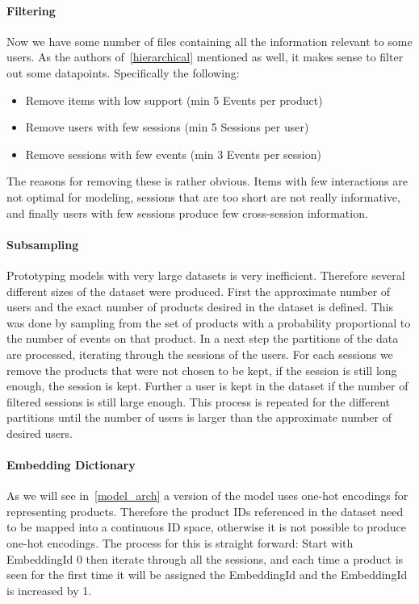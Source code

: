 \paragraph{Filtering}
Now we have some number of files containing all the information relevant to some users.
As the authors of~\ref{hierarchical} mentioned as well, it makes sense to filter out some datapoints.
Specifically the following:
\begin{itemize}
    \item Remove items with low support (min 5 Events per product)
    \item Remove users with few sessions (min 5 Sessions per user)
    \item Remove sessions with few events (min 3 Events per session)
\end{itemize}
The reasons for removing these is rather obvious.
Items with few interactions are not optimal for modeling, sessions that are too short are not really informative, and finally users with few sessions produce few cross-session information.

\paragraph{Subsampling}
Prototyping models with very large datasets is very inefficient.
Therefore several different sizes of the dataset were produced.
First the approximate number of users and the exact number of products desired in the dataset is defined.
This was done by sampling from the set of products with a probability proportional to the number of events on that product.
In a next step the partitions of the data are processed, iterating through the sessions of the users.
For each sessions we remove the products that were not chosen to be kept, if the session is still long enough, the session is kept.
Further a user is kept in the dataset if the number of filtered sessions is still large enough.
This process is repeated for the different partitions until the number of users is larger than the approximate number of desired users.

\paragraph{Embedding Dictionary}
As we will see in~\ref{model_arch} a version of the model uses one-hot encodings for representing products.
Therefore the product IDs referenced in the dataset need to be mapped into a continuous ID space, otherwise it is not possible to produce one-hot encodings.
The process for this is straight forward: Start with EmbeddingId 0 then iterate through all the sessions, and each time a product is seen for the first time it will be assigned the EmbeddingId and the EmbeddingId is increased by 1.

